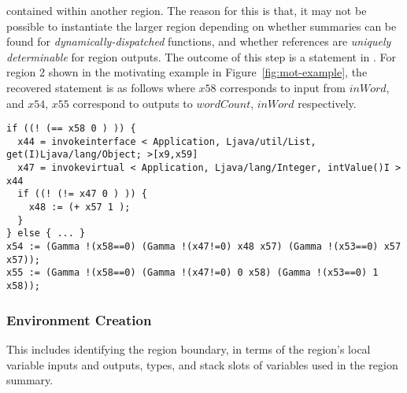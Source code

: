 contained within another region.
%
The reason for this is that, it may not be possible to instantiate the larger region depending on whether summaries can be found
for {\em dynamically-dispatched} functions, and whether references are {\em uniquely determinable} for region outputs.
%
The outcome of this step is a statement in \tool.
%
For region 2 shown in the motivating example in Figure~\ref{fig:mot-example}, the recovered statement is as follows where
$x58$ corresponds to input from $inWord$, and $x54$, $x55$ correspond to outputs to $wordCount$,
$inWord$ respectively.\\
%
\begin{lstlisting}[numbers=none]
if ((! (== x58 0 ) )) {
  x44 = invokeinterface < Application, Ljava/util/List, get(I)Ljava/lang/Object; >[x9,x59]
  x47 = invokevirtual < Application, Ljava/lang/Integer, intValue()I > x44
  if ((! (!= x47 0 ) )) {
    x48 := (+ x57 1 );
  }
} else { ... }
x54 := (Gamma !(x58==0) (Gamma !(x47!=0) x48 x57) (Gamma !(x53==0) x57 x57));
x55 := (Gamma !(x58==0) (Gamma !(x47!=0) 0 x58) (Gamma !(x53==0) 1 x58));

\end{lstlisting}
\subsubsection{Environment Creation}

%
This includes identifying the region boundary, in terms of the region\rq s local variable inputs and outputs, types, and stack
slots of variables used in the region summary.
%
%
%

%

